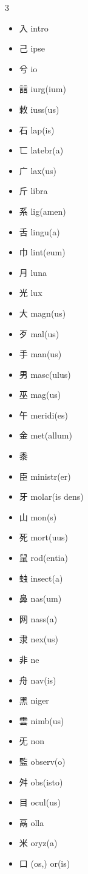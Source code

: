 \documentclass[xetex, svgnames, 12pt]{scrartcl}
\begin{document}
\begin{multicols}{3}
\begin{itemize}[noitemsep]
   \item 入 intro
    \item 己 ipse
   \item 兮 io 
   \item 誩 iurg(ium)
   \item 敕 iuss(us)
   \item 石 lap(is)
   \item 匸 latebr(a)
   \item 广 lax(us) 
   \item 斤 libra 
   \item 系 lig(amen)
   \item 舌 lingu(a)
   \item 巾 lint(eum) 
   \item 月 luna 
   \item 光 lux
   \item 大 magn(us) 
   \item 歹 mal(us) 
   \item 手 man(us) 
   \item 男 masc(ulus) 
   \item 巫 mag(us)
   \item 午 meridi(es)
   \item 金 met(allum)
   \item 黍 
   \item 臣 ministr(er)
   \item 牙 molar(is dens)
   \item 山 mon(s)
   \item 死 mort(uus)
   \item 鼠 rod(entia)
   \item 䖵 insect(a)
    \item 鼻 nas(um)
    \item 网 nass(a) 
    \item 隶 nex(us)
    \item 非 ne
    \item 舟 nav(is) 
    \item 黑 niger 
    \item 雲 nimb(us)
    \item 旡 non 
    \item 監 observ(o) 
    \item 舛 obs(isto) 
    \item 目 ocul(us)
    \item 鬲 olla
    \item 米 oryz(a) 
    \item 口 (os,) or(is)

\end{itemize}
\end{multicols}
\end{document}
